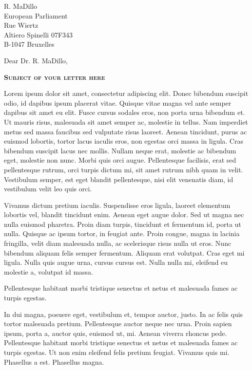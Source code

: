 \documentclass[a4paper,10pt]{letter}
\date{February 31, 2012}
\begin{document}
\begin{letter}{
    R. MaDillo\\
    European Parliament\\
    Rue Wiertz\\
    Altiero Spinelli 07F343\\
    B-1047 Bruxelles 
  }
  \opening{Dear Dr. R. MaDillo,}
%
  \begin{center}
    \textbf{\textsc{Subject of your letter here}}
  \end{center}
%
  Lorem ipsum dolor sit amet, consectetur adipiscing elit. Donec bibendum 
  suscipit odio, id dapibus ipsum placerat vitae. Quisque vitae magna vel ante 
  semper dapibus sit amet eu elit. Fusce cursus sodales eros, non porta urna 
  bibendum et. Ut mauris risus, malesuada sit amet semper ac, molestie in 
  tellus. Nam imperdiet metus sed massa faucibus sed vulputate risus laoreet. 
  Aenean tincidunt, purus ac euismod lobortis, tortor lacus iaculis eros, non 
  egestas orci massa in ligula. Cras bibendum suscipit lacus nec mollis. Nullam 
  neque erat, molestie ac bibendum eget, molestie non nunc. Morbi quis orci 
  augue. Pellentesque facilisis, erat sed pellentesque rutrum, orci turpis 
  dictum mi, sit amet rutrum nibh quam in velit. Vestibulum semper, est eget 
  blandit pellentesque, nisi elit venenatis diam, id vestibulum velit leo quis 
  orci. 
  
  Vivamus dictum pretium iaculis. Suspendisse eros ligula, laoreet 
  elementum lobortis vel, blandit tincidunt enim. Aenean eget augue dolor. Sed 
  ut magna nec nulla euismod pharetra. Proin diam turpis, tincidunt et fermentum 
  id, porta ut nulla. Quisque ac ipsum tortor, in feugiat ante. Proin congue, 
  magna in lacinia fringilla, velit diam malesuada nulla, ac scelerisque risus 
  nulla ut eros. Nunc bibendum aliquam felis semper fermentum. Aliquam erat 
  volutpat. Cras eget mi ligula. Nulla quis augue urna, cursus cursus est. Nulla 
  nulla mi, eleifend eu molestie a, volutpat id massa. 
  
  Pellentesque habitant morbi tristique senectus et netus et malesuada fames ac 
  turpis egestas.

  In dui magna, posuere eget, vestibulum et, tempor auctor, justo. In ac felis 
  quis tortor malesuada pretium. Pellentesque auctor neque nec urna. Proin 
  sapien ipsum, porta a, auctor quis, euismod ut, mi. Aenean viverra rhoncus 
  pede. Pellentesque habitant morbi tristique senectus et netus et malesuada 
  fames ac turpis egestas. Ut non enim eleifend felis pretium feugiat. Vivamus 
  quis mi. Phasellus a est. Phasellus magna.


\end{letter}
\end{document}
